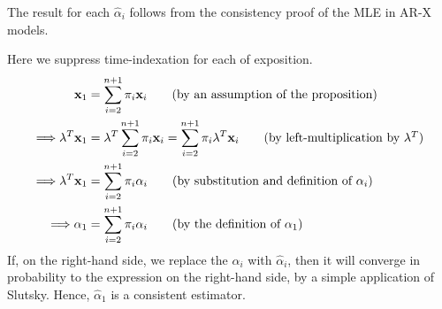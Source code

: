 \documentclass{uiucthesis2021}
\newcommand{\weight}{\pi}
\newcommand{\xx}{\textbf{x}}
\theoremstyle{definition}
\newenvironment{proof-of-proposition}[1][{}]{\noindent{\bf
    Proof of Proposition {#1}}
  \hspace*{.5em}}{\qed\bigskip\\}
\begin{document}
  \begin{proof-of-proposition}[\ref{ARIMA_param_consistency}]
  
    The result for each $\hat\alpha_{i}$ follows from the consistency proof of the MLE in AR-X models.
    
    \end{proof-of-proposition}
  
    \begin{proof-of-proposition}[\ref{ARIMA_aggregated_alpha}]
      Here we suppress time-indexation for each of exposition.
      \begin{align}
        \xx_{1} &= \sum^{n+1}_{i=2}\weight_{i}\xx_{i} \tag{by an assumption of the proposition}\\
       \Longrightarrow \lambda^{T}\xx_{1} &= \lambda^{T}\sum^{n+1}_{i=2}\weight_{i}\xx_{i}  = \sum^{n+1}_{i=2}\weight_{i}\lambda^{T}\xx_{i}\tag{by left-multiplication by $\lambda^{T}$}\\
        \Longrightarrow\lambda^{T}\xx_{1} &=\sum^{n+1}_{i=2}\pi_{i}\alpha_{i}\tag{by substitution and definition of $\alpha_{i}$}\\
        \Longrightarrow\alpha_{1} &=\sum^{n+1}_{i=2}\pi_{i}\alpha_{i} \tag{by the definition of $\alpha_{1}$}
        \end{align} 
        If, on the right-hand side, we replace the $\alpha_{i}$ with $\hat\alpha_{i}$, then it will converge in probability to the expression on the right-hand side, by a simple application of Slutsky.  Hence, $\hat\alpha_{1}$ is a consistent estimator.
    \end{proof-of-proposition}
  
\end{document}
